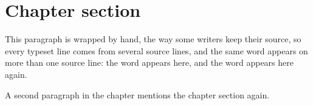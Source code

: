 \section{Chapter section}

This paragraph is wrapped by hand,
the way some writers keep their source,
so every typeset line comes from
several source lines, and the same word
appears on more than one source line:
the word appears here, and the word
appears here again.

A second paragraph in the chapter mentions the chapter section again.
